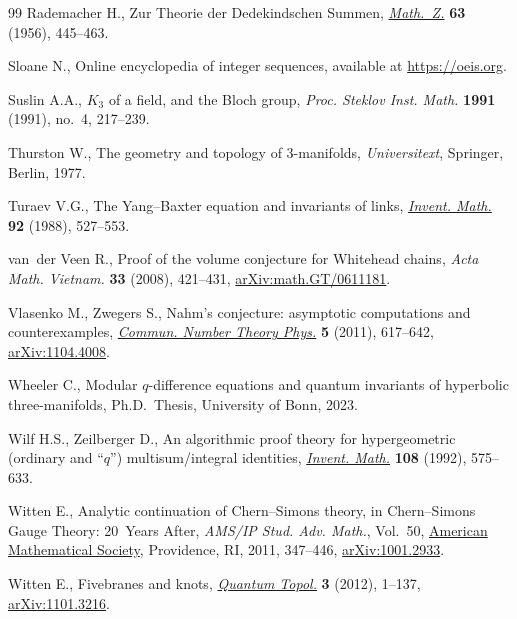 \documentclass[pdftex]{sigma}
\numberwithin{equation}{section}
\begin{document}
\begin{thebibliography}{99}
Rademacher H., Zur {T}heorie der {D}edekindschen {S}ummen, \href{https://doi.org/10.1007/BF01187951}{\textit{Math.~Z.}}
 \textbf{63} (1956), 445--463.

Sloane N., Online encyclopedia of integer sequences, available at
 \url{https://oeis.org}.

Suslin A.A., {$K_3$} of a field, and the {B}loch group, \textit{Proc. Steklov
 Inst. Math.} \textbf{1991} (1991), no.~4, 217--239.

Thurston W., The geometry and topology of 3-manifolds, \textit{Universitext}, Springer,
 Berlin, 1977.

Turaev V.G., The {Y}ang--{B}axter equation and invariants of links,
 \href{https://doi.org/10.1007/BF01393746}{\textit{Invent. Math.}} \textbf{92} (1988), 527--553.

van~der Veen R., Proof of the volume conjecture for {W}hitehead chains,
 \textit{Acta Math. Vietnam.} \textbf{33} (2008), 421--431,
 \href{https://arxiv.org/abs/math.GT/0611181}{arXiv:math.GT/0611181}.

Vlasenko M., Zwegers S., Nahm's conjecture: asymptotic computations and
 counterexamples, \href{https://doi.org/10.4310/CNTP.2011.v5.n3.a2}{\textit{Commun. Number Theory Phys.}} \textbf{5} (2011),
 617--642, \href{https://arxiv.org/abs/1104.4008}{arXiv:1104.4008}.

Wheeler C., Modular {$q$}-difference equations and quantum invariants of
 hyperbolic three-manifolds, Ph.D.~Thesis, {U}niversity of {B}onn, 2023.

Wilf H.S., Zeilberger D., An algorithmic proof theory for hypergeometric
 (ordinary and ``{$q$}'') multisum/integral identities, \href{https://doi.org/10.1007/BF02100618}{\textit{Invent. Math.}}
 \textbf{108} (1992), 575--633.

Witten E., Analytic continuation of {C}hern--{S}imons theory, in
 Chern--{S}imons {G}auge {T}heory: 20~{Y}ears {A}fter, \textit{AMS/IP Stud.
 Adv. Math.}, Vol.~50, \href{https://doi.org/10.1090/amsip/050/19}{American Mathematical Society}, Providence, RI, 2011,
 347--446, \href{https://arxiv.org/abs/1001.2933}{arXiv:1001.2933}.

Witten E., Fivebranes and knots, \href{https://doi.org/10.4171/QT/26}{\textit{Quantum Topol.}} \textbf{3} (2012),
 1--137, \href{https://arxiv.org/abs/1101.3216}{arXiv:1101.3216}.


\end{thebibliography}
\end{document}
